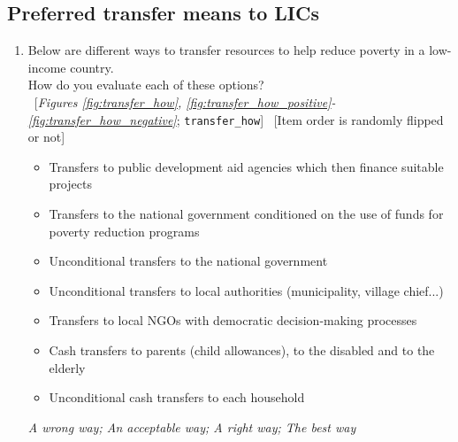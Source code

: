  \subsection*{Preferred transfer means to LICs} 
 \begin{enumerate}[resume] 
\item  \label{q:transfer_how} Below are different ways to transfer resources to help reduce poverty in a low-income country.~\\How do you evaluate each of these options?\\ 
~[\textit{Figures \ref{fig:transfer_how}, \ref{fig:transfer_how_positive}-\ref{fig:transfer_how_negative}}; 
\verb|transfer_how|]
~[Item order is randomly flipped or not]
\begin{itemize}
  \item Transfers to public development aid agencies which then finance suitable projects
  \item Transfers to the national government conditioned on the use of funds for poverty reduction programs
  \item Unconditional transfers to the national government
  \item Unconditional transfers to local authorities (municipality, village chief...)
  \item Transfers to local NGOs with democratic decision-making processes
  \item Cash transfers to parents (child allowances), to the disabled and to the elderly
  \item Unconditional cash transfers to each household
\end{itemize}
\textit{A wrong way; An acceptable way; A right way; The best way}

\end{enumerate} 

